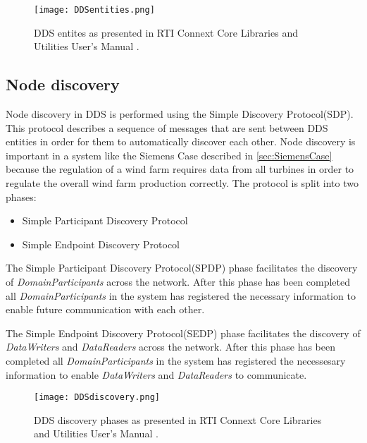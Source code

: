 \begin{figure}
	\centering
	\texttt{[image: DDSentities.png]} 
	\caption[DDS entities]{
		\label{fig:ddsEntities} 
		\footnotesize{%
			DDS entites as presented in RTI Connext Core Libraries and Utilities User's Manual \cite{rtiConnextUsersManual}.
		}
	}
\end{figure}

\subsection{Node discovery}
Node discovery in DDS is performed using the Simple Discovery Protocol(SDP).
This protocol describes a sequence of messages that are sent between DDS entities in order for them to automatically discover each other.
Node discovery is important in a system like the Siemens Case described in \cref{sec:SiemensCase} because the regulation of a wind farm requires data from all turbines in order to regulate the overall wind farm production correctly.
The protocol is split into two phases:

\begin{itemize}
	\item Simple Participant Discovery Protocol
	\item Simple Endpoint Discovery Protocol
\end{itemize}

The Simple Participant Discovery Protocol(SPDP) phase facilitates the discovery of \textit{DomainParticipants} across the network.
After this phase has been completed all \textit{DomainParticipants} in the system has registered the necessary information to enable future communication with each other.

The Simple Endpoint Discovery Protocol(SEDP) phase facilitates the discovery of \textit{DataWriters} and \textit{DataReaders} across the network.
After this phase has been completed all \textit{DomainParticipants} in the system has registered the necessesary information to enable \textit{DataWriters} and \textit{DataReaders} to communicate.

\begin{figure}
	\centering
	\texttt{[image: DDSdiscovery.png]} 
	\caption[DDS discovery phases]{
		\label{fig:DDSdiscovery} 
		\footnotesize{%
			DDS discovery phases as presented in RTI Connext Core Libraries and Utilities User's Manual \cite{rtiConnextUsersManual}.
		}
	}
\end{figure}

